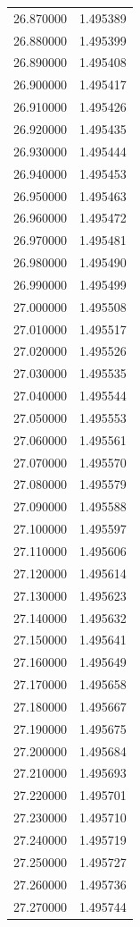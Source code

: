 \begin{tabular}{rr}
26.870000 & 1.495389 \\
26.880000 & 1.495399 \\
26.890000 & 1.495408 \\
26.900000 & 1.495417 \\
26.910000 & 1.495426 \\
26.920000 & 1.495435 \\
26.930000 & 1.495444 \\
26.940000 & 1.495453 \\
26.950000 & 1.495463 \\
26.960000 & 1.495472 \\
26.970000 & 1.495481 \\
26.980000 & 1.495490 \\
26.990000 & 1.495499 \\
27.000000 & 1.495508 \\
27.010000 & 1.495517 \\
27.020000 & 1.495526 \\
27.030000 & 1.495535 \\
27.040000 & 1.495544 \\
27.050000 & 1.495553 \\
27.060000 & 1.495561 \\
27.070000 & 1.495570 \\
27.080000 & 1.495579 \\
27.090000 & 1.495588 \\
27.100000 & 1.495597 \\
27.110000 & 1.495606 \\
27.120000 & 1.495614 \\
27.130000 & 1.495623 \\
27.140000 & 1.495632 \\
27.150000 & 1.495641 \\
27.160000 & 1.495649 \\
27.170000 & 1.495658 \\
27.180000 & 1.495667 \\
27.190000 & 1.495675 \\
27.200000 & 1.495684 \\
27.210000 & 1.495693 \\
27.220000 & 1.495701 \\
27.230000 & 1.495710 \\
27.240000 & 1.495719 \\
27.250000 & 1.495727 \\
27.260000 & 1.495736 \\
27.270000 & 1.495744 \\

\end{tabular}

